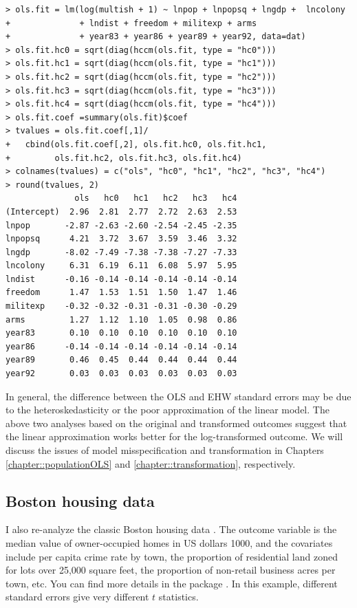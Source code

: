 \begin{lstlisting}
> ols.fit = lm(log(multish + 1) ~ lnpop + lnpopsq + lngdp +  lncolony 
+              + lndist + freedom + militexp + arms 
+              + year83 + year86 + year89 + year92, data=dat)
> ols.fit.hc0 = sqrt(diag(hccm(ols.fit, type = "hc0")))
> ols.fit.hc1 = sqrt(diag(hccm(ols.fit, type = "hc1")))
> ols.fit.hc2 = sqrt(diag(hccm(ols.fit, type = "hc2")))
> ols.fit.hc3 = sqrt(diag(hccm(ols.fit, type = "hc3")))
> ols.fit.hc4 = sqrt(diag(hccm(ols.fit, type = "hc4")))
> ols.fit.coef =summary(ols.fit)$coef
> tvalues = ols.fit.coef[,1]/
+   cbind(ols.fit.coef[,2], ols.fit.hc0, ols.fit.hc1, 
+         ols.fit.hc2, ols.fit.hc3, ols.fit.hc4)
> colnames(tvalues) = c("ols", "hc0", "hc1", "hc2", "hc3", "hc4")
> round(tvalues, 2)
              ols   hc0   hc1   hc2   hc3   hc4
(Intercept)  2.96  2.81  2.77  2.72  2.63  2.53
lnpop       -2.87 -2.63 -2.60 -2.54 -2.45 -2.35
lnpopsq      4.21  3.72  3.67  3.59  3.46  3.32
lngdp       -8.02 -7.49 -7.38 -7.38 -7.27 -7.33
lncolony     6.31  6.19  6.11  6.08  5.97  5.95
lndist      -0.16 -0.14 -0.14 -0.14 -0.14 -0.14
freedom      1.47  1.53  1.51  1.50  1.47  1.46
militexp    -0.32 -0.32 -0.31 -0.31 -0.30 -0.29
arms         1.27  1.12  1.10  1.05  0.98  0.86
year83       0.10  0.10  0.10  0.10  0.10  0.10
year86      -0.14 -0.14 -0.14 -0.14 -0.14 -0.14
year89       0.46  0.45  0.44  0.44  0.44  0.44
year92       0.03  0.03  0.03  0.03  0.03  0.03
\end{lstlisting}


  In general, the difference between the OLS and EHW standard errors may be due to the heteroskedasticity or the poor approximation of the linear model. The above two analyses based on the original and transformed outcomes suggest that the linear approximation works better for the log-transformed outcome. 
  We will discuss the issues of model misspecification and transformation in Chapters \ref{chapter::populationOLS} and \ref{chapter::transformation}, respectively. 
  



\subsection{Boston housing data}


I also re-analyze the classic Boston housing data \citep{harrison1978hedonic}. The outcome variable is the median value of owner-occupied homes in US dollars 1000, and the covariates include per capita crime rate by town, the proportion of residential land zoned for lots over 25,000 square feet, the proportion of non-retail business acres per town, etc. You can find more details in the  package . In this example, different standard errors give very different $t$ statistics. 


